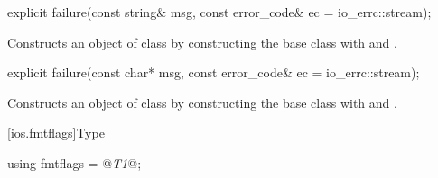 %
\begin{itemdecl}
explicit failure(const string& msg, const error_code& ec = io_errc::stream);
\end{itemdecl}

\begin{itemdescr}
\pnum
\effects
Constructs an object of class
 by constructing the base class with  and .
\end{itemdescr}

%
\begin{itemdecl}
explicit failure(const char* msg, const error_code& ec = io_errc::stream);
\end{itemdecl}

\begin{itemdescr}
\pnum
\effects
Constructs an object of class
 by constructing the base class with  and .
\end{itemdescr}

[ios.fmtflags]{Type }

%
\begin{itemdecl}
using fmtflags = @\textit{T1}@;
\end{itemdecl}

